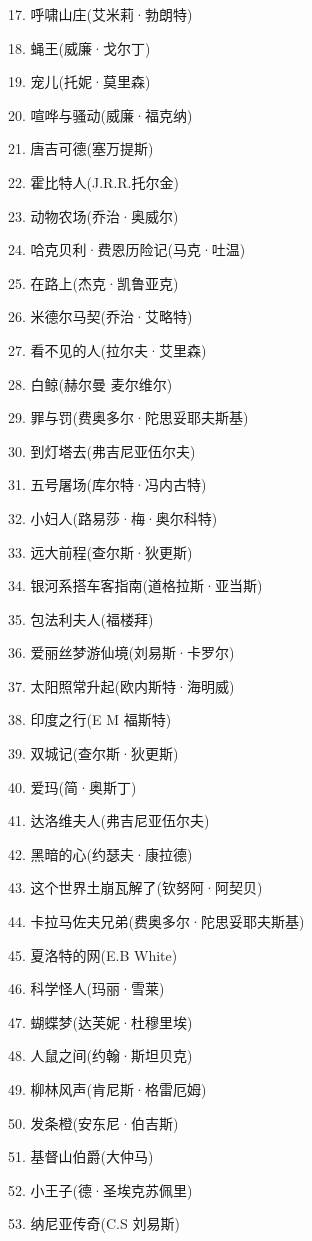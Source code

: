 \documentclass[UTF8]{../RepresentationUniverse}
\begin{document}
17. 呼啸山庄(艾米莉·勃朗特) 

18. 蝇王(威廉·戈尔丁) 

19. 宠儿(托妮·莫里森) 

20. 喧哗与骚动(威廉·福克纳) 

21. 唐吉可德(塞万提斯) 

22. 霍比特人(J.R.R.托尔金) 

23. 动物农场(乔治·奥威尔) 

24. 哈克贝利·费恩历险记(马克·吐温) 

25. 在路上(杰克·凯鲁亚克) 

26. 米德尔马契(乔治·艾略特) 

27. 看不见的人(拉尔夫·艾里森) 

28. 白鲸(赫尔曼 麦尔维尔) 

29. 罪与罚(费奥多尔·陀思妥耶夫斯基) 

30. 到灯塔去(弗吉尼亚伍尔夫) 

31. 五号屠场(库尔特·冯内古特) 

32. 小妇人(路易莎·梅·奥尔科特) 

33. 远大前程(查尔斯·狄更斯) 

34. 银河系搭车客指南(道格拉斯·亚当斯) 

35. 包法利夫人(福楼拜) 

36. 爱丽丝梦游仙境(刘易斯·卡罗尔) 

37. 太阳照常升起(欧内斯特·海明威) 

38. 印度之行(E M 福斯特) 

39. 双城记(查尔斯·狄更斯) 

40. 爱玛(简·奥斯丁) 

41. 达洛维夫人(弗吉尼亚伍尔夫) 

42. 黑暗的心(约瑟夫·康拉德) 

43. 这个世界土崩瓦解了(钦努阿·阿契贝) 

44. 卡拉马佐夫兄弟(费奥多尔·陀思妥耶夫斯基) 

45. 夏洛特的网(E.B White) 

46. 科学怪人(玛丽·雪莱) 

47. 蝴蝶梦(达芙妮·杜穆里埃) 

48. 人鼠之间(约翰·斯坦贝克) 

49. 柳林风声(肯尼斯·格雷厄姆) 

50. 发条橙(安东尼·伯吉斯) 

51. 基督山伯爵(大仲马) 

52. 小王子(德·圣埃克苏佩里) 

53. 纳尼亚传奇(C.S 刘易斯) 
\end{document}
